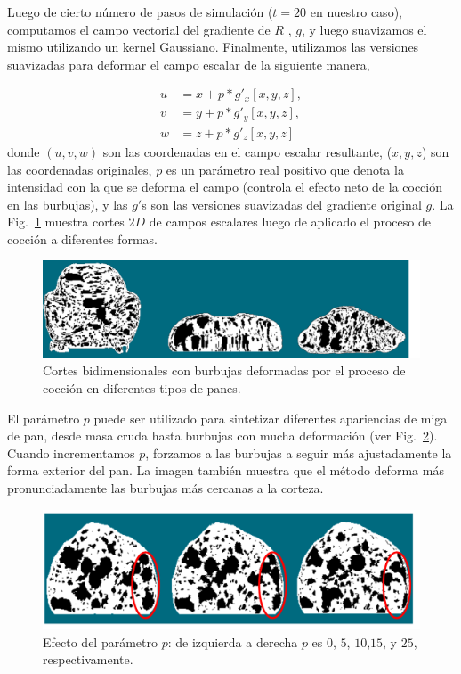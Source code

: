 Luego de cierto número de pasos de simulación ($t=20$ en nuestro caso), computamos el campo vectorial del gradiente de $R$ \cite{Gonzalez2006}, $g$, y luego suavizamos el mismo utilizando un kernel Gaussiano.
Finalmente, utilizamos las versiones suavizadas para deformar el campo escalar de la siguiente manera,

\begin{align*}
\displaystyle
u &= x+p*g'_{x}[x,y,z],\\
v &= y+p*g'_{y}[x,y,z],\\
w &= z+p*g'_{z}[x,y,z]
\end{align*}
donde $(u,v,w)$ son las coordenadas en el campo escalar resultante, ($x,y,z$) son las coordenadas originales, $p$ es un parámetro real positivo que denota la intensidad con la que se deforma el campo (controla el efecto neto de la cocción en las burbujas), y las $g'$s son las versiones suavizadas del gradiente original $g$.
La Fig.~\ref{fg:bakedbubbles} muestra cortes $2D$ de campos escalares luego de aplicado el proceso de cocción a diferentes formas.

\begin{figure}
\includegraphics[width=13cm]{figures/bakedbubbles}
\caption{Cortes bidimensionales con burbujas deformadas por el proceso de cocción en diferentes tipos de panes.}
\label{fg:bakedbubbles}
\end{figure}

El parámetro $p$ puede ser utilizado para sintetizar diferentes apariencias de miga de pan, desde masa cruda hasta burbujas con mucha deformación (ver Fig.~\ref{fg:parameterp}).
Cuando incrementamos $p$, forzamos a las burbujas a seguir más ajustadamente la forma exterior del pan. 
La imagen también muestra que el método deforma más pronunciadamente las burbujas más cercanas a la corteza.

\begin{figure}
\includegraphics[width=13cm]{figures/parameterp}
\caption[Efecto del parámetro $p$ en la simulación de cocción]{Efecto del parámetro $p$: de izquierda a derecha $p$ es $0$, $5$, $10$,$15$, y $25$, respectivamente.}
\label{fg:parameterp}
\end{figure}


